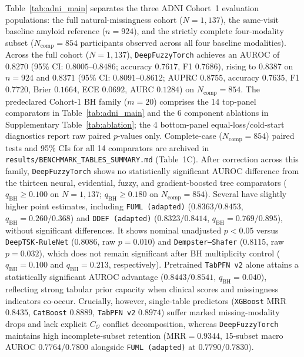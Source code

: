 \documentclass[10pt,twocolumn]{article}
\begin{document}
Table~\ref{tab:adni_main} separates the three ADNI Cohort~1 evaluation populations: the full
natural-missingness cohort ($N=1,137$), the same-visit baseline amyloid reference ($n=924$),
and
the strictly complete four-modality subset ($N_{\text{comp}}=854$ participants observed across
all
four baseline modalities). Across the full cohort ($N=1,137$), \texttt{DeepFuzzyTorch} achieves
an
AUROC of $0.8270$ (95\% CI: $0.8005\text{--}0.8486$; accuracy $0.7617$, F1 $0.7686$), rising to
$0.8387$ on $n=924$ and $0.8371$ (95\% CI: $0.8091\text{--}0.8612$; AUPRC $0.8755$, accuracy
$0.7635$, F1 $0.7720$, Brier $0.1664$, ECE $0.0692$, AURC $0.1284$) on $N_{\text{comp}}=854$.
The predeclared Cohort-1 BH family ($m=20$) comprises the 14 top-panel comparators in
Table~\ref{tab:adni_main} and the 6 component ablations in Supplementary
Table~\ref{tab:ablation}; the 4
bottom-panel equal-loss/cold-start diagnostics report raw paired $p$-values only. Complete-case
($N_{\text{comp}}=854$) paired tests and 95\% CIs for all 14 comparators are archived in
\texttt{results/\allowbreak BENCHMARK\_\allowbreak TABLES\_\allowbreak SUMMARY.md} (Table~1C).
After correction across this family,
\texttt{DeepFuzzyTorch} shows no statistically significant AUROC difference from the thirteen
neural, evidential, fuzzy, and gradient-boosted tree comparators ($q_{\text{BH}}\ge 0.100$ on
$N=1,137$; $q_{\text{BH}}\ge 0.180$ on $N_{\text{comp}}=854$). Several have slightly higher
point estimates, including \texttt{FUML (adapted)} ($0.8363/0.8453$,
$q_{\text{BH}}=0.260/0.368$) and \texttt{DDEF (adapted)} ($0.8323/0.8414$,
$q_{\text{BH}}=0.769/0.895$), without significant differences. It shows nominal unadjusted
$p<0.05$ versus \texttt{DeepTSK-RuleNet} ($0.8086$, raw $p=0.010$) and
\texttt{Dempster--Shafer} ($0.8115$, raw $p=0.032$), which does not remain significant after
BH multiplicity control ($q_{\text{BH}}=0.100$ and $q_{\text{BH}}=0.213$, respectively).
Pretrained \texttt{TabPFN~v2} alone attains a statistically significant AUROC advantage
($0.8443/0.8541$, $q_{\text{BH}}=0.040$), reflecting strong tabular prior capacity when
clinical scores and missingness indicators co-occur. Crucially, however,
single-table predictors (\texttt{XGBoost} MRR $0.8435$, \texttt{CatBoost} $0.8889$,
\texttt{TabPFN~v2} $0.8974$) suffer marked missing-modality drops and lack explicit
$C_{\mathcal{O}}$
conflict decomposition, whereas \texttt{DeepFuzzyTorch} maintains high incomplete-subset
retention ($\text{MRR}=0.9344$, 15-subset macro AUROC $0.7764 / 0.7800$ alongside
\texttt{FUML (adapted)} at $0.7790 / 0.7830$).
\end{document}
